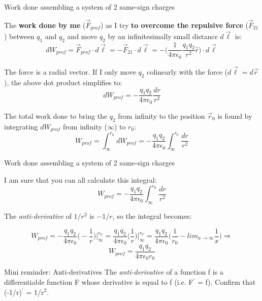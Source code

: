 %
%
%

\begin{frame}{Work done assembling a system of 2 same-sign charges}

The {\bf work done by me} ($\vec{F}_{prof}$)
as I try {\bf to overcome the repulsive force} ($\vec{F}_{21}$) between $q_1$ and $q_2$
and move $q_2$  by an infinitesimally small distance $d\vec{\ell}$ is:
\begin{equation*}
  dW_{prof} =
    \vec{F}_{prof} \cdot d\vec{\ell} =
  - \vec{F}_{21} \cdot d\vec{\ell} =
  - \Big( \frac{1}{4\pi\epsilon_0} \frac{q_1 q_2}{r^2} \hat{r} \Big) \cdot d\vec{\ell}
\end{equation*}

The force is a radial vector. If I only move $q_2$ colinearly with  the force ($d\vec{\ell} = d\vec{r}$),
the above dot product simplifies to:
\begin{equation*}
  dW_{prof} = - \frac{q_1 q_2}{4\pi\epsilon_0} \frac{dr}{r^2}
\end{equation*}


The total work done to bring the $q_2$ from infinity to the position $\vec{r}_0$
is found by integrating $dW_{prof}$ from infinity ($\infty$) to $r_0$:
\begin{equation*}
  W_{prof} = \int_{\infty}^{r_{0}} dW_{prof} = - \frac{q_1 q_2}{4\pi\epsilon_0}  \int_{\infty}^{r_{0}}  \frac{dr}{r^2}
\end{equation*}

\end{frame}

%
%
%

\begin{frame}{Work done assembling a system of 2 same-sign charges}

I am sure that you can all calculate this integral:
\begin{equation*}
  W_{prof} = - \frac{q_1 q_2}{4\pi\epsilon_0}  \int_{\infty}^{r_{0}}  \frac{dr}{r^2}
\end{equation*}


The {\em anti-derivative} of $1/r^2$ is $-1/r$, so the integral becomes:

\begin{equation*}
\displaystyle
  W_{prof} = - \frac{q_1 q_2}{4\pi\epsilon_0} \Big( -\frac{1}{r} \Big)  {\rvert}_{\infty}^{r_{0}}
           = \frac{q_1 q_2}{4\pi\epsilon_0}  \Big( \frac{1}{r} \Big) {\rvert}_{\infty}^{r_{0}}
           = \frac{q_1 q_2}{4\pi\epsilon_0}  \Big( \frac{1}{r_0} - lim_{x\rightarrow\infty}\frac{1}{x} \Big) \Rightarrow
\end{equation*}
\begin{equation*}
  W_{prof} = \frac{q_1 q_2}{4\pi\epsilon_0 r_0}
\end{equation*}

\begin{blockminirem}{Mini reminder: Anti-derivatives}
 The {\em anti-derivative} of a function f is a differentiable function F whose derivative is equal to f (i.e. F$^{\prime}$ = f).
 Confirm that (-1/r)$^{\prime}$ = 1/r$^2$.
\end{blockminirem}

\end{frame}

